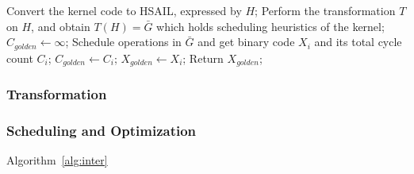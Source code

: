 \documentclass[12pt]{article}
\begin{document}
\begin{CJK}{UTF8}{bkai}
\begin{algorithm}[h]
\begin{algorithmic}[1]
                  \State Convert the kernel code to HSAIL, expressed by $H$;
                  \label{line:tohsail}
                  \State Perform the transformation $T$ on $H$, and obtain $T(H) = \bar{G}$ which holds scheduling heuristics of the kernel;
                  \label{line:tran}
                  \State $C_{golden} \leftarrow  \infty$;
                  \label{line:optstart}
                    \label{line:forlambda}
                    \State Schedule operations in $\bar{G}$ and get binary code $X_i$ and its total cycle count $C_i$;
                      \State $C_{golden} \leftarrow C_i$;
                      \State $X_{golden} \leftarrow X_i$;
                    \EndIf
                  \EndFor
                  \State Return $X_{golden}$;
                  \label{line:optend}
              \end{algorithmic}
              \label{alg:framework}
            \end{algorithm}


        
        \subsubsection{Transformation}
        \label{sec:trans}
        \subsubsection{Scheduling and Optimization}
        Algorithm~\ref{alg:inter}
        \label{sec:sando}


\end{CJK}
\end{document}
